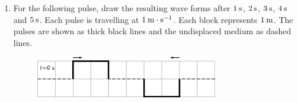 \begin{enumerate}[noitemsep, label=\textbf{\arabic*}. ]
\begin{figure}[H]
\begin{center}
      \vspace{2pt}
    \vspace{.1in}
    
    \end{center}

 \end{figure}   

    \addtocounter{footnote}{-0}
            \label{m38802*uid57}\item For the following pulse, draw the resulting wave forms after \begin{math}1\phantom{\rule{2pt}{0ex}}\mathrm{s}\end{math}, \begin{math}2\phantom{\rule{2pt}{0ex}}\mathrm{s}\end{math}, \begin{math}3\phantom{\rule{2pt}{0ex}}\mathrm{s}\end{math}, \begin{math}4\phantom{\rule{2pt}{0ex}}\mathrm{s}\end{math} and \begin{math}5\phantom{\rule{2pt}{0ex}}\mathrm{s}\end{math}. Each pulse is travelling at \begin{math}1\phantom{\rule{2pt}{0ex}}\mathrm{m}\ensuremath{\cdot}\mathrm{s}{}^{-1}\end{math}. Each block represents \begin{math}1\phantom{\rule{2pt}{0ex}}\mathrm{m}\end{math}. The pulses are shown as thick black lines and the undisplaced medium as dashed lines.
    \setcounter{subfigure}{0}


	\begin{figure}[H] %
    \begin{center}
    \label{m38802*id316477!!!underscore!!!media}\label{m38802*id316477!!!underscore!!!printimage}\includegraphics[width=300px]{col11305.imgs/m38802_PG10C4_025.png} %
        
      \vspace{2pt}
    \vspace{.1in}
    
    \end{center}


\end{figure}
\end{enumerate}
